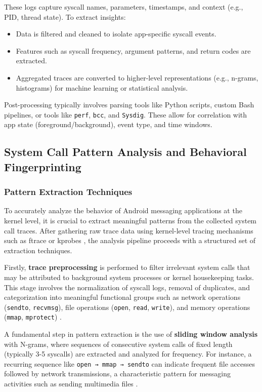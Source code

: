 \documentclass[a4paper,12pt]{report}
\begin{document}
These logs capture syscall names, parameters, timestamps, and context (e.g., PID, thread state). To extract insights:

\begin{itemize}
\item Data is filtered and cleaned to isolate app-specific syscall events.
\item Features such as syscall frequency, argument patterns, and return codes are extracted.
\item Aggregated traces are converted to higher-level representations (e.g., n-grams, histograms) for machine learning or statistical analysis.
\end{itemize}

Post-processing typically involves parsing tools like Python scripts, custom Bash pipelines, or tools like \texttt{perf}, \texttt{bcc}, and \texttt{Sysdig}. These allow for correlation with app state (foreground/background), event type, and time windows.

\subsection{System Call Pattern Analysis and Behavioral Fingerprinting}

\subsubsection{Pattern Extraction Techniques}
To accurately analyze the behavior of Android messaging applications at the kernel level, it is crucial to extract meaningful patterns from the collected system call traces. After gathering raw trace data using kernel-level tracing mechanisms such as ftrace or kprobes \cite{gregg2019bpf}, the analysis pipeline proceeds with a structured set of extraction techniques.

Firstly, \textbf{trace preprocessing} is performed to filter irrelevant system calls that may be attributed to background system processes or kernel housekeeping tasks. This stage involves the normalization of syscall logs, removal of duplicates, and categorization into meaningful functional groups such as network operations (\texttt{sendto}, \texttt{recvmsg}), file operations (\texttt{open}, \texttt{read}, \texttt{write}), and memory operations (\texttt{mmap}, \texttt{mprotect}) \cite{tanenbaum2015modern}.

A fundamental step in pattern extraction is the use of \textbf{sliding window analysis} with N-grams, where sequences of consecutive system calls of fixed length (typically 3-5 syscalls) are extracted and analyzed for frequency. For instance, a recurring sequence like \texttt{open → mmap → sendto} can indicate frequent file accesses followed by network transmissions, a characteristic pattern for messaging activities such as sending multimedia files \cite{kim2019syscall}.
\end{document}

